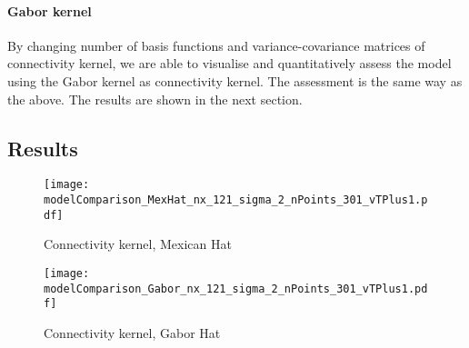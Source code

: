 \documentclass[a4paper, 12pt, english]{article}
\begin{document}
\paragraph{Gabor kernel\newline}
By changing number of basis functions and variance-covariance matrices of
connectivity kernel, we are able to visualise and quantitatively assess the model
using the Gabor kernel as connectivity kernel. The assessment is the same way as the above.
The results are shown in the next section.


\subsection{Results}

\begin{figure}[H]
\centering
\texttt{[image: modelComparison\_MexHat\_nx\_121\_sigma\_2\_nPoints\_301\_vTPlus1.pdf]}
\caption{Connectivity kernel, Mexican Hat}
\end{figure}

\begin{figure}[H]
\centering
\texttt{[image: modelComparison\_Gabor\_nx\_121\_sigma\_2\_nPoints\_301\_vTPlus1.pdf]}
\caption{Connectivity kernel, Gabor Hat}
\end{figure}



\end{document}
